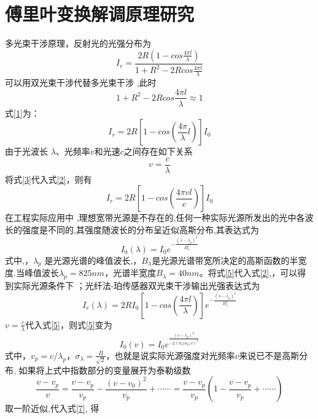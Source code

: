\chapter{傅里叶变换解调原理研究}
多光束干涉原理，反射光的光强分布为
\begin{equation}
I_r=\frac{2R(1-cos\frac{4\pi l}{\lambda})}{1+R^2-2Rcos\frac{4\pi l}{\lambda}}
\label{1}
\end{equation}
可以用双光束干涉代替多光束干涉 ,此时
$$1+R^{2}-2Rcos\frac{4\pi l}{\lambda}\approx1$$
式\ref{1}为：
\begin{equation}
I_r=2R\left[1-cos(\frac{4\pi}{\lambda}l) \right ]I_{0}
\label{2}
\end{equation}
由于光波长 $\lambda$、光频率$v$和光速$c$之间存在如下关系
\begin{equation}
v=\frac{c}{\lambda}
\label{3}
\end{equation}
将式\ref{3}代入式\ref{2}，则有
\begin{equation}
I_{r}=2R\left[1-cos(\frac{4\pi vl}{c}) \right ]I_{0}
\end{equation}
在工程实际应用中 ,理想宽带光源是不存在的,任何一种实际光源所发出的光中各波长的强度是不同的,其强度随波长的分布呈近似高斯分布,其表达式为
\begin{equation}
I_{0}(\lambda)=I_{0}e^{-\frac{(\lambda-\lambda_{p})^{2}}{B^{2}_{\lambda}}}
\label{5}
\end{equation}
式中,，$\lambda_{p}$ 是光源光谱的峰值波长,，$B_{\lambda}$是光源光谱带宽所决定的高斯函数的半宽度.当峰值波长$\lambda_{p}=825 nm$，光谱半宽度$B_{\lambda}=40 nm$。将式\ref{5}代入式\ref{2},，可以得到实际光源条件下 ；光纤法-珀传感器双光束干涉输出光强表达式为
\begin{equation}
I_{r}(\lambda)=2RI_{0}\left[1-cos(\frac{4\pi l}{\lambda}) \right ]e^{-\frac{(\lambda-\lambda_{p})^{2}}{B^{2}_{\lambda}}}
\label{6}
\end{equation}
$v=\frac{c}{\lambda}$代入式\ref{5}，则式\ref{5}变为
\begin{equation}
I_{0}(v)=I_{0}e^{\frac{(v-v_{p})^{2}}{-2(\sigma_{\lambda}vv_{p}/c)^{2}}}
\label{7}
\end{equation}
式中，$v_{p}=c/\lambda_{p}$，$\sigma_{\lambda}=\frac{B}{\sqrt{2}}$，也就是说实际光源强度对光频率$ v$来说已不是高斯分布, 如果将上式中指数部分的变量展开为泰勒级数
\begin{equation}
\frac{v-v_{p}}{v}=\frac{v-v_{p}}{v_{p}}-\frac{(v-v_{0})^{2}}{v_p}+\cdots\cdots=\frac{v-v_{p}}{v_{p}}(1-\frac{v-v_{p}}{v_{p}}+\cdots\cdots)
\end{equation}
取一阶近似,代入式\ref{7}, 得
